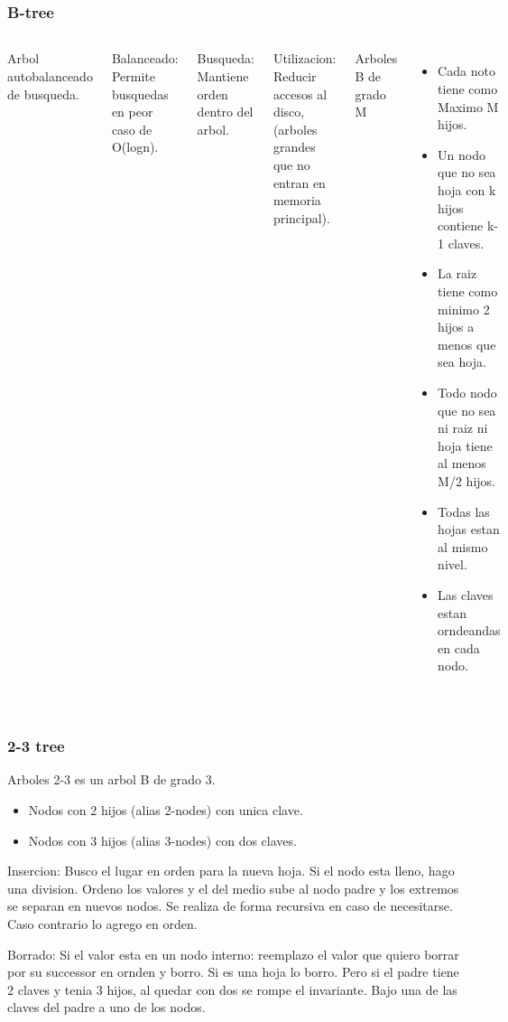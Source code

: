 \documentclass[10pt]{beamer}
\begin{document}
\section{}
\begin{frame}
\frametitle{B-tree}

\begin{columns}
        Arbol autobalanceado de busqueda.

Balanceado: Permite busquedas en peor caso de O(logn).

Busqueda: Mantiene orden dentro del arbol.

Utilizacion: Reducir accesos al disco, (arboles grandes que no entran en memoria principal).

Arboles B de grado M
        \begin{itemize}
          \item Cada noto tiene como Maximo M hijos.
          \item Un nodo que no sea hoja con k hijos contiene k-1 claves.
          \item La raiz tiene como minimo 2 hijos a menos que sea hoja.
          \item Todo nodo que no sea ni raiz ni hoja tiene al menos M/2 hijos.
          \item Todas las hojas estan al mismo nivel.
          \item Las claves estan orndeandas en cada nodo.
        \end{itemize}
\end{columns}
\end{frame}

\section{}
\begin{frame}
\frametitle{2-3 tree}

Arboles 2-3 es un arbol B de grado 3.
\begin{itemize}
  \item Nodos con 2 hijos (alias 2-nodes) con unica clave.
  \item Nodos con 3 hijos (alias 3-nodes) con dos claves.
\end{itemize}

Insercion: Busco el lugar en orden para la nueva hoja. Si el nodo esta lleno, hago una division.
Ordeno los valores y el del medio sube al nodo padre y los extremos se separan en nuevos nodos.
Se realiza de forma recursiva en caso de necesitarse.
Caso contrario lo agrego en orden.

Borrado: Si el valor esta en un nodo interno: reemplazo el valor que quiero borrar por su
successor en ornden y borro.
Si es una hoja lo borro. Pero si el padre tiene 2 claves y tenia 3 hijos, al quedar con dos se rompe el invariante.
Bajo una de las claves del padre a uno de los nodos.
\end{frame}
\end{document}

